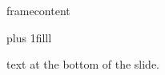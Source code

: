 \documentclass{beamer}
\newcommand{\btVFill}{\vskip0pt plus 1filll}
\begin{document}
\begin{frame}
 framecontent

 \btVFill

 text at the bottom of the slide. 
\end{frame}
\end{document}

